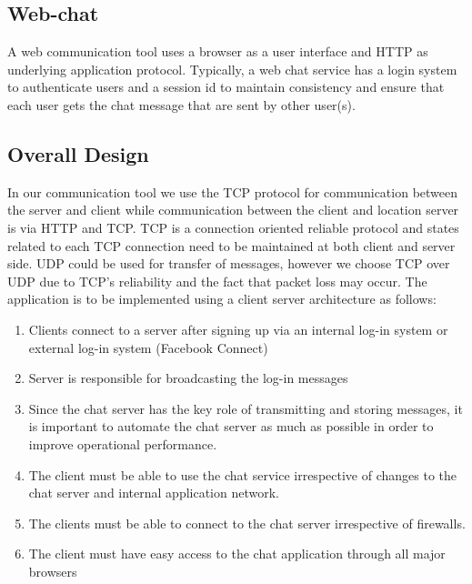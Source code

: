 \documentclass[12pt]{article}
\begin{document}
\subsection{Web-chat} 
A web communication tool uses a browser as a user interface and HTTP as underlying 
application protocol. Typically, a web chat service has a login system to 
authenticate users and a session id to maintain consistency and ensure that each 
user gets the chat message that are sent by other user(s).  

\subsection{Overall Design} 
In our communication tool we use the TCP protocol for communication between the server 
and client while communication between the client and location server is via HTTP and TCP. 
TCP is a connection oriented reliable protocol and states related to each TCP 
connection need to be maintained at both client and server side. UDP could be used 
for transfer of messages, however we choose TCP over UDP due to TCP's reliability and the fact
that packet loss may occur.  The application is to be implemented using a
client server architecture as follows: 

\begin{enumerate} 
\item Clients connect to a server after signing up via an internal log-in system or external log-in
system (Facebook Connect) 
\item Server is responsible for broadcasting the log-in messages 
\item Since the chat server has the key role of transmitting and storing messages, it is 
important to automate the chat server as much as possible in order to improve operational performance.  
\item The client must be able to use the chat service irrespective of changes to the chat server and internal application
network.  
\item The clients must be able to connect to the chat server irrespective of firewalls.  
\item The client must have easy access to the chat
application through all major browsers 
\end{enumerate} 
\end{document}
